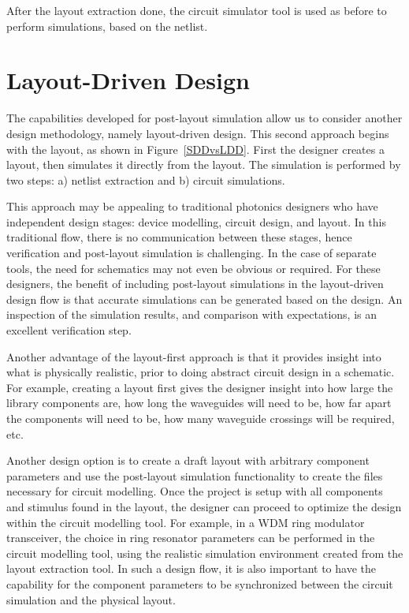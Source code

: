 \documentclass[journal]{spie}
\begin{document}
After the layout extraction done, the circuit simulator tool is used as before to perform simulations, based on the netlist.

\section{Layout-Driven Design}

The capabilities developed for post-layout simulation allow us to consider another design methodology, namely layout-driven design.   This second approach begins with the layout, as shown in Figure~\ref{SDDvsLDD}.  First the designer creates a layout, then simulates it directly from the layout.  The simulation is performed by two steps: a) netlist extraction and b) circuit simulations.  

This approach may be appealing to traditional photonics designers who have independent design stages: device modelling, circuit design, and layout.  In this traditional flow, there is no communication between these stages, hence verification and post-layout simulation is challenging.  In the case of separate tools, the need for schematics may not even be obvious or required.  For these designers, the benefit of including post-layout simulations in the layout-driven design flow is that accurate simulations can be generated based on the design.  An inspection of the simulation results, and comparison with expectations, is an excellent verification step.

Another advantage of the layout-first approach is that it provides insight into what is physically realistic, prior to doing abstract circuit design in a schematic.  For example, creating a layout first gives the designer insight into how large the library components are, how long the waveguides will need to be, how far apart the components will need to be, how many waveguide crossings will be required, etc.  

Another design option is to create a draft layout with arbitrary component parameters and use the post-layout simulation functionality to create the files necessary for circuit modelling.  Once the project is setup with all components and stimulus found in the layout, the designer can proceed to optimize the design within the circuit modelling tool.  For example, in a WDM ring modulator transceiver, the choice in ring resonator parameters can be performed in the circuit modelling tool, using the realistic simulation environment created from the layout extraction tool.  In such a design flow, it is also important to have the capability for the component parameters to be synchronized between the circuit simulation and the physical layout.
\end{document}
